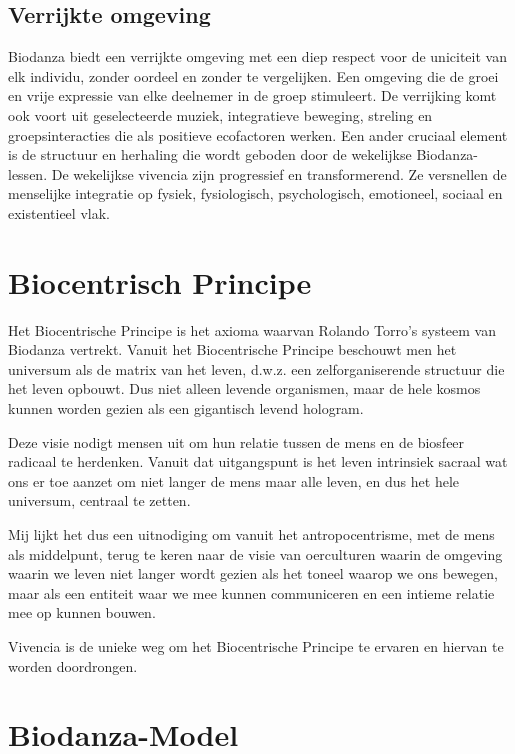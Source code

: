 \documentclass[
  11pt,
]{book}
\begin{document}
\hypertarget{verrijkte-omgeving}{%
\subsection{Verrijkte omgeving}\label{verrijkte-omgeving}}

Biodanza biedt een verrijkte omgeving met een diep respect voor de uniciteit van elk individu, zonder oordeel en zonder te vergelijken. Een omgeving die de groei en vrije expressie van elke deelnemer in de groep stimuleert. De verrijking komt ook voort uit geselecteerde muziek, integratieve beweging, streling en groepsinteracties die als positieve ecofactoren werken. Een ander cruciaal element is de structuur en herhaling die wordt geboden door de wekelijkse Biodanza-lessen. De wekelijkse vivencia zijn progressief en transformerend. Ze versnellen de menselijke integratie op fysiek, fysiologisch, psychologisch, emotioneel, sociaal en existentieel vlak.

\hypertarget{sectionBiocentricPrinciple}{%
\section{Biocentrisch Principe}\label{sectionBiocentricPrinciple}}

Het Biocentrische Principe is het axioma waarvan Rolando Torro's systeem van Biodanza vertrekt. Vanuit het Biocentrische Principe beschouwt men het universum als de matrix van het leven, d.w.z. een zelforganiserende structuur die het leven opbouwt. Dus niet alleen levende organismen, maar de hele kosmos kunnen worden gezien als een gigantisch levend hologram.

Deze visie nodigt mensen uit om hun relatie tussen de mens en de biosfeer radicaal te herdenken. Vanuit dat uitgangspunt is het leven intrinsiek sacraal wat ons er toe aanzet om niet langer de mens maar alle leven, en dus het hele universum, centraal te zetten.

Mij lijkt het dus een uitnodiging om vanuit het antropocentrisme, met de mens als middelpunt, terug te keren naar de visie van oerculturen waarin de omgeving waarin we leven niet langer wordt gezien als het toneel waarop we ons bewegen, maar als een entiteit waar we mee kunnen communiceren en een intieme relatie mee op kunnen bouwen.

Vivencia is de unieke weg om het Biocentrische Principe te ervaren en hiervan te worden doordrongen.

\hypertarget{sectionModelOfBiodanza}{%
\section{Biodanza-Model}\label{sectionModelOfBiodanza}}
\end{document}

